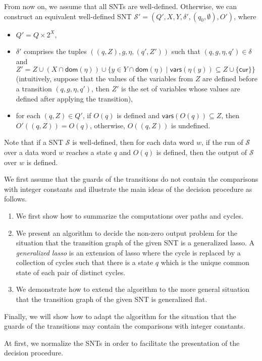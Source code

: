 \documentclass[runningheads,a4paper]{llncs}
\def\Ss{{\mathcal{S} }}
\newcommand\cur{\mathsf{cur}}
\newcommand\vars{\mathsf{vars}}
\newcommand\dom{\mathsf{dom}}
\begin{document}
From now on, we assume that all SNTs are well-defined. Otherwise, we can construct an equivalent well-defined SNT $\Ss'=(Q', X,Y, \delta', (q_0,\emptyset), O')$, where 
\begin{itemize}
	\item $Q' = Q \times 2^X$,
	\item $\delta'$ comprises the tuples $((q,Z),g,\eta,(q', Z'))$ such that $(q,g,\eta,q') \in \delta$ and $Z' = Z \cup (X \cap \dom(\eta)) \cup \{y \in Y \cap \dom(\eta) \mid \vars(\eta(y)) \subseteq Z \cup \{\cur\}\}$ (intuitively, suppose that the values of the variables from $Z$ are defined before a transition $(q,g,\eta,q')$, then $Z'$ is the set of variables whose values are defined after applying the transition),
	\item for each $(q,Z) \in Q'$, if $O(q)$ is defined and $\vars(O(q)) \subseteq Z$, then $O'((q,Z))=O(q)$, otherwise, $O((q,Z))$ is undefined.
\end{itemize}

Note that if a SNT $\Ss$ is well-defined, then for each data word $w$, if the run of $\Ss$ over a data word $w$ reaches a state $q$ and $O(q)$ is defined, then the output of $\Ss$ over $w$ is defined.

We first assume that the guards of the transitions do not contain the comparisons with integer constants and illustrate the main ideas of the decision procedure as follows.
\begin{enumerate}
	\item  We first show how to summarize the computations over paths and cycles. 
	\item We present an algorithm to decide the non-zero output problem for the situation that the transition graph of the given SNT  is a generalized lasso. A \emph{generalized lasso} is an extension of lasso where the cycle is replaced by a collection of cycles such that there is a state $q$ which is the unique common state of each pair of distinct cycles.
	\item We demonstrate how to extend the algorithm to the more general situation that the transition graph of the given SNT is generalized flat.
\end{enumerate}
Finally, we will show how to adapt the algorithm for the situation that the guards of the transitions may contain the comparisons with integer constants.

At first, we normalize the SNTs in order to facilitate the presentation of the decision procedure.
\end{document}
